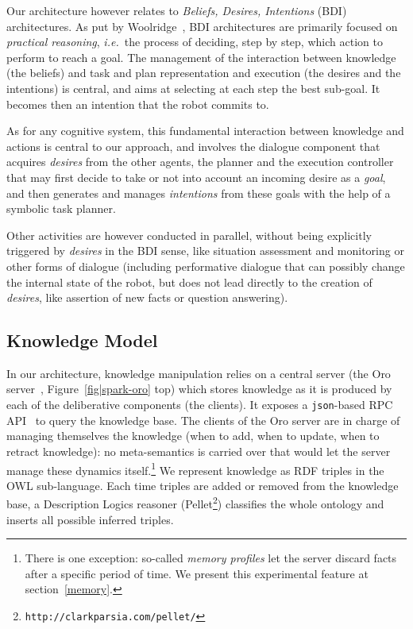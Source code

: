 \documentclass[preprint,3p,times]{elsarticle}
\newcommand{\ie}{{\textit{i.e.\ }}}
\begin{document}
Our architecture however relates to \emph{Beliefs, Desires, Intentions} (BDI)
architectures. As put by Woolridge~\cite{Woolridge1999}, BDI architectures are
primarily focused on \emph{practical reasoning}, \ie the process of deciding,
step by step, which action to perform to reach a goal. The management of the
interaction between knowledge (the beliefs) and task and plan representation and
execution (the desires and the intentions) is central, and aims at selecting at
each step the best sub-goal. It becomes then an intention that the robot commits
to.

As for any cognitive system, this fundamental interaction between knowledge and
actions is central to our approach, and involves the dialogue component that
acquires \emph{desires} from the other agents, the planner and the execution
controller that may first decide to take or not into account an incoming desire
as a \emph{goal}, and then generates and manages \emph{intentions} from these
goals with the help of a symbolic task planner.

Other activities are however conducted in parallel, without being explicitly
triggered by \emph{desires} in the BDI sense, like situation assessment and
monitoring or other forms of dialogue (including performative dialogue that can
possibly change the internal state of the robot, but does not lead directly to
the creation of \emph{desires}, like assertion of new facts or question
answering).

\subsection{Knowledge Model}

In our architecture, knowledge manipulation relies on a central server (the {\sc
Oro} server~\cite{Lemaignan2010}, Figure~\ref{fig|spark-oro} top) which stores
knowledge as it is produced by each of the deliberative components (the
clients). It exposes a {\tt json}-based RPC API~\cite{lemaignan2012kbapi} to
query the knowledge base. The clients of the {\sc Oro} server are in charge of
managing themselves the knowledge (when to add, when to update, when to
retract knowledge): no meta-semantics is carried over that would let the server
manage these dynamics itself.\footnote{There is one exception: so-called
\emph{memory profiles} let the server discard facts after a specific period
of time. We present this experimental feature at section~\ref{memory}.} We
represent knowledge as RDF triples in the OWL sub-language. Each time
triples are added or removed from the knowledge base, a Description Logics
reasoner ({\sc Pellet}\footnote{\tt http://clarkparsia.com/pellet/})
classifies the whole ontology and inserts all possible inferred triples.
\end{document}
